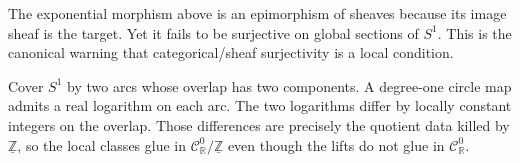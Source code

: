 \begin{example}
The exponential morphism above is an epimorphism of sheaves because its image sheaf is the target. Yet it fails to be surjective on global sections of $S^1$. This is the canonical warning that categorical/sheaf surjectivity is a local condition.
\end{example}

\begin{example}
Cover $S^1$ by two arcs whose overlap has two components. A degree-one circle map admits a real logarithm on each arc. The two logarithms differ by locally constant integers on the overlap. Those differences are precisely the quotient data killed by $\underline{\mathbb Z}$, so the local classes glue in $\mathcal C^0_{\mathbb R}/\underline{\mathbb Z}$ even though the lifts do not glue in $\mathcal C^0_{\mathbb R}$.
\end{example}


